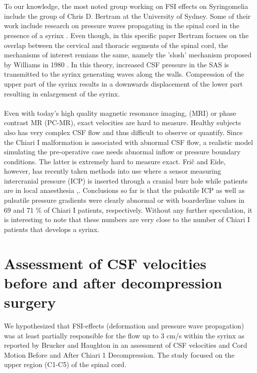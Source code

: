 \\
\\
To our knowledge, the most noted group working on FSI effects on Syringomelia include the group of Chris D. Bertram at the University of Sydney. Some of their work include research on pressure waves propagating in the spinal cord in the presence of a syrinx \cite{Bert09}. Even though, in this specific paper Bertram focuses on the overlap between the cervical and thoracic segments of the spinal cord, the mechanisms of interest remians the same, namely the 'slosh' mechanism proposed by Williams in 1980 \cite{Will80}. In this theory, increased CSF pressure in the SAS is transmitted to the syrinx generating waves along the walls. Compression of the upper part of the syrinx results in a downwards displacement of the lower part resulting in enlargement of the syrinx. 
\\
\\
Even with today's high quality magnetic resonance imaging, (MRI) or phase contrast MR (PC-MR), exact velocities are hard to measure. Healthy subjects also has very complex CSF flow and thus difficult to observe or quantify. Since the Chiari I malformation is associated with abnormal CSF flow, a realistic model simulating the pre-operative case needs abnormal inflow or pressure boundary conditions. The latter is extremely hard to measure exact. Fri{\v{c}} and Eide, however, has recently taken methods into use where a sensor measuring intercranial pressure (ICP) is inserted through a cranial burr hole while patients are in local anaesthesia \cite{Fric15},\cite{Fric16}. Conclusions so far is that the pulsatile ICP as well as pulsatile pressure gradients were clearly abnormal or with boarderline values in 69 and 71 \% of Chiari I patients, respectively. Without any further speculation, it is interesting to note that these numbers are very close to the number of Chiari I patients that develops a syrinx. 



\section{Assessment of CSF velocities before and after decompression surgery}
We hypothesized that FSI-effects (deformation and pressure wave propagation) was at least partially responsible for the flow up to 3 cm/s within the syrinx as reported by Brucker and Haughton in an assessment of CSF velocities and Cord Motion Before and After Chiari 1 Decompression. The study focused on the upper region (C1-C5) of the spinal cord.

